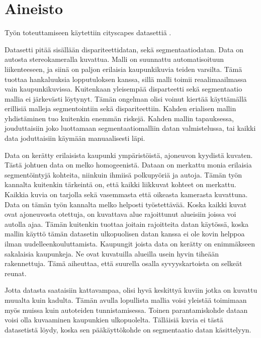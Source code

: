 \chapter{Aineisto}%
\label{ch:aineisto}

Työn toteuttamiseen käytettiin cityscapes datasettiä \cite{Cordts2016Cityscapes}.


Datasetti pitää sisällään dispariteettidatan, sekä segmentaatiodatan.
Data on autosta stereokameralla kuvattua.
Malli on suunnattu automatisoituun liikenteeseen, ja siinä on paljon erilaisia kaupunkikuvia teiden varsilta.
Tämä tuottaa hankaluuksia lopputuloksen kanssa, sillä malli toimii reaalimaailmassa vain kaupunkikuvissa.
Kuitenkaan yleisempää disparteetti sekä segmentaatio mallia ei järkevästi löytynyt. 
Tämän ongelman olisi voinut kiertää käyttämällä erillisiä malleja segmentointiin sekä dispariteettiin. 
Kahden erialisen mallin yhdistäminen tuo kuitenkin enemmän riskejä.
Kahden mallin tapauksessa, jouduttaisiin joko luottamaan segmentaatiomalliin datan valmistelussa, 
tai kaikki data joduttaisiin käymään manuaalisesti läpi.

Data on kerätty erilaisista kaupunki ympäristöistä, ajoneuvon kyydistä kuvaten.
Tästä johtuen data on melko homogeenistä. Dataan on merkattu monia erilaisia segmentöintyjä kohteita, niinkuin ihmiisä polkupyöriä ja autoja. 
Tämän työn kannalta kuitenkin tärkeintä on, että kaikki liikkuvat kohteet on merkattu.
Kaikkia kuvia on tarjolla sekä vasemmasta että oikeasta kamerasta kuvattuna.
Data on tämän työn kannalta melko helposti työstettävää. Koska kaikki kuvat ovat ajoneuvosta otettuja, on kuvattava alue rajoittunut alueisiin joissa voi autolla ajaa.
Tämän kuitenkin tuottaa joitain rajoitteita datan käytössä, koska mallin käyttö tämän datasetin ulkopuolisen datan kanssa ei ole kovin helppoa ilman uudelleenkouluttamista.
Kaupungit joista data on kerätty on enimmäkseen sakalaisia kaupunkeja.
Ne ovat kuvatuilla alueilla usein hyvin tiheään rakennettuja. 
Tämä aiheuttaa, että suurella osalla syvyyskartoista on selkeät reunat.

Jotta datasta saataisiin kattavampaa, olisi hyvä keskittyä kuviin jotka on kuvattu muualta kuin kadulta.
Tämän avulla lopullista mallia voisi yleistää toimimaan myös muissa kuin autoteiden tunnistamisessa.
Toinen parantamiskohde dataan voisi olla kuvaaminen kaupunkien ulkopuolelta.
Tälläisiä kuvia ei tästä datasetistä löydy, koska sen pääkäyttökohde on segmentaatio datan käsittelyyn.

